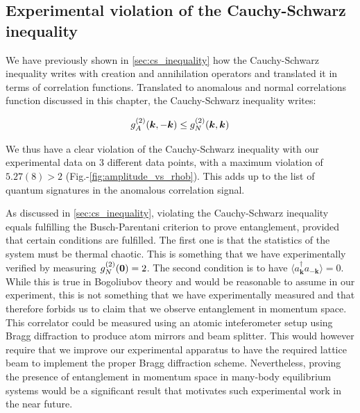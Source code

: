 \subsection{Experimental violation of the Cauchy-Schwarz inequality}

We have previously shown in \ref{sec:cs_inequality} how the Cauchy-Schwarz inequality writes with creation and annihilation operators and translated it in terms of correlation functions. Translated to anomalous and normal correlations function discussed in this chapter, the Cauchy-Schwarz inequality writes:

\begin{equation}
    g^{(2)}_A (\bm{k},-\bm{k}) \leq g^{(2)}_N (\bm{k},\bm{k})
\end{equation}

We thus have a clear violation of the Cauchy-Schwarz inequality with our experimental data on 3 different data points, with a maximum violation of $5.27(8) > 2$ (Fig.-\ref{fig:amplitude_vs_rhob}). This adds up to the list of quantum signatures in the anomalous correlation signal.

As discussed in \ref{sec:cs_inequality}, violating the Cauchy-Schwarz inequality equals fulfilling the Busch-Parentani criterion to prove entanglement, provided that certain conditions are fulfilled. The first one is that the statistics of the system must be thermal chaotic. This is something that we have experimentally verified by measuring $g^{(2)}_N (\bm{0}) = 2$. The second condition is to have $\langle a^{\dagger}_{\bm k} a_{-\bm k} \rangle=0$. While this is true in Bogoliubov theory and would be reasonable to assume in our experiment, this is not something that we have experimentally measured and that therefore forbids us to claim that we observe entanglement in momentum space. This correlator could be measured using an atomic inteferometer setup \cite{dussarrat2017two,kasevich1991atomic,lopes2015atomic} using Bragg diffraction \cite{martin1988bragg} to produce atom mirrors and beam splitter. This would however require that we improve our experimental apparatus to have the required lattice beam to implement the proper Bragg diffraction scheme. Nevertheless, proving the presence of entanglement in momentum space in many-body equilibrium systems would be a significant result that motivates such experimental work in the near future. 



